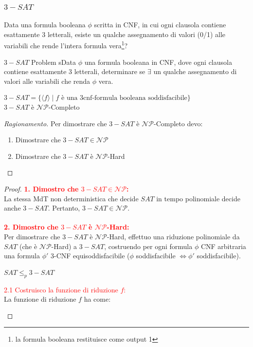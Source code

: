 \documentclass{article}  %
\theoremstyle{definition}
\newenvironment{ragionamento}[1][]
  {\begin{proof}[Ragionamento#1]\renewcommand{\qedsymbol}{}\normalfont}
  {\end{proof}}
\begin{document}
\subsubsection{$3-SAT$}
Data una formula booleana $\phi$ scritta in CNF, in cui ogni clausola contiene esattamente 3 letterali,
esiste un qualche assegnamento di valori (0/1) alle variabili che rende l'intera formula vera\footnote{la formula booleana
	restituisce come output 1}?
\begin{theorem}{$3-SAT$ Problem}
	sData $\phi$ una formula booleana in CNF, dove ogni clausola contiene esattamente 3 letterali, determinare se $\exists$ un qualche
	assegnamento di valori alle variabili che renda $\phi$ vera.
	\begin{center}
		$3-SAT = \{\langle f \rangle \mid f \text{ è una 3cnf-formula booleana soddisfacibile}\}$ \\
		$3-SAT$ è $\mathcal{NP}$-Completo
	\end{center}
	\footnotesize
	\begin{ragionamento}
		Per dimostrare che $3-SAT$ è $\mathcal{NP}$-Completo devo:
		\begin{enumerate}
			\item Dimostrare che $3-SAT \in \mathcal{NP}$
			\item Dimostrare che $3-SAT$ è $\mathcal{NP}$-Hard
		\end{enumerate}
	\end{ragionamento}
	\begin{proof}
		\textcolor{red}{\textbf{1. Dimostro che $3-SAT \in \mathcal{NP}$:}}\\
		La stessa MdT non deterministica che decide $SAT$ in tempo polinomiale decide anche $3-SAT$.
		Pertanto, $3-SAT \in \mathcal{NP}$. \\ \\
		\textcolor{red}{\textbf{2. Dimostro che $3-SAT$ è $\mathcal{NP}$-Hard:}}\\
		Per dimostrare che $3-SAT$ è $\mathcal{NP}$-Hard, effettuo una riduzione polinomiale da $SAT$ (che è $\mathcal{NP}$-Hard) a $3-SAT$,
		costruendo per ogni formula $\phi$ CNF arbitraria una formula $\phi'$ 3-CNF equisoddisfacibile ($\phi$ soddisfacibile $\iff \phi'$ soddisfacibile).
		\begin{center}
			$SAT \leq_p 3-SAT$
		\end{center}
		\textcolor{red}{{2.1 Costruisco la funzione di riduzione $f$:}} \\
		La funzione di riduzione $f$ ha come:
		\begin{itemize}

\end{itemize}
\end{proof}
\end{theorem}
\end{document}

